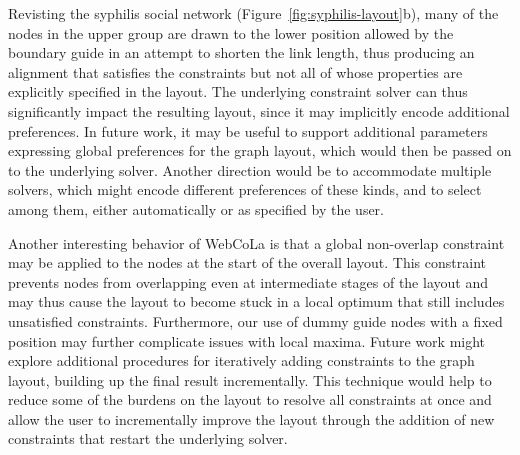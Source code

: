 Revisting the syphilis social network
(Figure~\ref{fig:syphilis-layout}b), many of the nodes in the upper group
are drawn to the lower position allowed by the boundary guide in an attempt
to shorten the link length, thus producing an alignment that satisfies the
\projectname constraints but not all of whose properties are explicitly
specified in the layout. The underlying constraint solver can thus
significantly impact the resulting layout, since it may implicitly encode
additional preferences.  In future work, it may be useful to support
additional parameters expressing global preferences for the graph layout,
which would then be passed on to the underlying solver.  Another direction
would be to accommodate multiple solvers, which might encode different
preferences of these kinds, and to select among them, either automatically
or as specified by the user.

Another interesting behavior of WebCoLa is that a global non-overlap constraint
may be applied to the nodes at the start of the overall layout. This constraint
prevents nodes from overlapping even at intermediate stages of the layout and
may thus cause the layout to become stuck in a local optimum that still
includes unsatisfied constraints. Furthermore, our use of
dummy guide nodes with a fixed position may further complicate issues
with local maxima. Future work might explore additional procedures for
iteratively adding constraints to the graph layout, building up the final
result incrementally. This technique would help to reduce some of the burdens
on the layout to resolve all constraints at once and allow the user to
incrementally improve the layout through the addition of new constraints
that restart the underlying solver.
